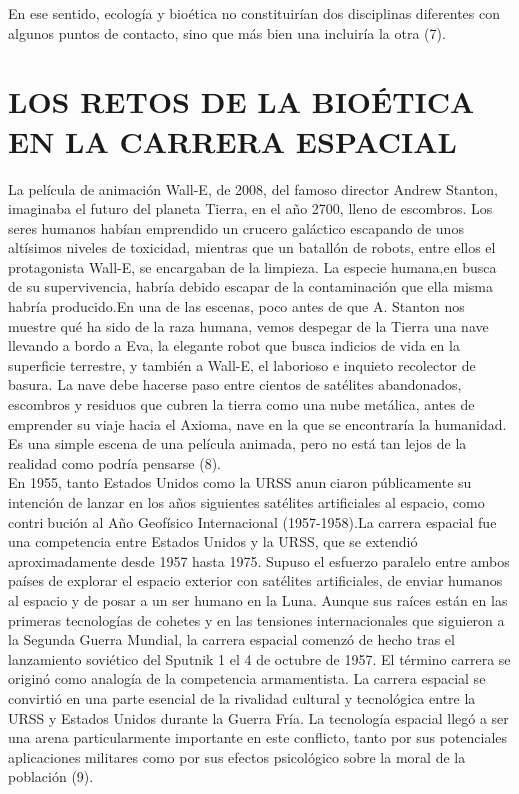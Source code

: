 \documentclass[12pt,letterpaper]{article}
\begin{document}
\pagestyle{fancy}
        \fancyhf{}
        \rhead{}
  
\begin{multicols}{2}
En ese sentido, ecología y bioética no constituirían dos disciplinas diferentes con algunos puntos de contacto, sino que más bien una incluiría la otra (7).

\section*{\noindent \small {LOS RETOS DE LA BIOÉTICA EN LA CARRERA ESPACIAL}}

\noindent La película de animación Wall-E, de 2008, del famoso director Andrew Stanton, imaginaba el futuro del planeta Tierra, en el año 2700, lleno de escombros. Los seres humanos habían emprendido un crucero galáctico escapando de unos altísimos niveles de toxicidad, mientras que un batallón de robots, entre ellos el protagonista Wall-E, se encargaban de la limpieza. La especie humana,en busca de su supervivencia, habría debido escapar de la contaminación que ella misma habría producido.En una de las escenas, poco antes de que A. Stanton nos muestre qué ha sido de la raza humana, vemos despegar de la Tierra una nave llevando a bordo a Eva, la elegante robot que busca indicios de vida en la superficie terrestre, y también a Wall-E, el laborioso e inquieto recolector de basura. La nave debe hacerse paso entre cientos de satélites abandonados, escombros y residuos que cubren la tierra como una nube metálica, antes de emprender su viaje hacia el Axioma, nave en la que se encontraría la humanidad. Es una simple escena de una película animada, pero no está tan lejos de la realidad 
como podría pensarse (8).
\\

\noindent En 1955, tanto Estados Unidos como la URSS anunciaron públicamente su intención de lanzar en los años siguientes satélites artificiales al espacio, como contribución al Año Geofísico Internacional (1957-1958).La carrera espacial fue una competencia entre Estados Unidos y la URSS, que se extendió aproximadamente desde 1957 hasta 1975. Supuso el esfuerzo paralelo entre ambos países de explorar el espacio exterior con satélites artificiales, de enviar humanos al espacio y de posar a un ser humano en la Luna. Aunque sus raíces están en las primeras tecnologías de cohetes y en las tensiones internacionales que siguieron a la Segunda Guerra Mundial, la carrera espacial comenzó de hecho tras el lanzamiento soviético del Sputnik 1 el 4 de octubre de 1957. El término carrera se originó como analogía de la competencia armamentista. La carrera espacial se convirtió en una parte esencial de la rivalidad cultural y tecnológica entre la URSS y Estados Unidos durante la Guerra Fría. La tecnología espacial llegó a ser una arena particularmente importante en este conflicto, tanto por sus potenciales aplicaciones militares como por sus efectos psicológico sobre la moral de la población (9).
\\


\end{multicols}
\end{document}
